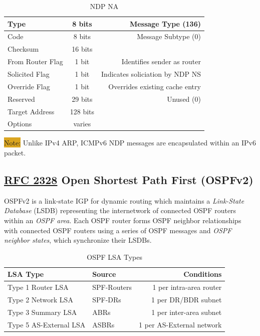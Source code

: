 \documentclass[12pt]{article}
\newcommand{\note}[1]{\colorbox{#1}{Note:}}
\newcommand{\RFC}[1]{\href{https://datatracker.ietf.org/doc/html/rfc#1}{RFC #1}}
\begin{document}
	\begin{table}[H]
	\centering
	\caption{NDP NA \label{tab:NDP NA}}
	\begin{tabular}{| l | c | r |}
	\hline
	Type				& 8 bits	& Message Type (136)\\\hline
	Code				& 8 bits	& Message Subtype (0)\\\hline
	Checksum			& 16 bits	&\\\hline
	From Router Flag		& 1 bit 	& Identifies sender as router\\\hline
	Solicited Flag		& 1 bit 	& Indicates soliciation by NDP NS\\\hline
	Override Flag		& 1 bit 	& Overrides existing cache entry\\\hline
	Reserved			& 29 bits	& Unused (0)\\\hline
	Target Address		& 128 bits	&\\\hline
	Options			& varies	&\\\hline
	\end{tabular}\end{table}
	\note{Goldenrod} Unlike IPv4 ARP, ICMPv6 NDP messages are encapsulated within an IPv6 packet.


	\subsection{\RFC{2328} Open Shortest Path First (OSPFv2) \label{subsec:OSPFv2}}
	OSPFv2 is a link-state IGP for dynamic routing which maintains a \textit{Link-State Database} (LSDB) representing the internetwork of connected OSPF routers within an \textit{OSPF area}. Each OSPF router forms OSPF neighbor relationships with connected OSPF routers using a series of OSPF messages and \textit{OSPF neighbor states}, which synchronize their LSDBs.

	\begin{table}[H]
	\centering
	\caption{OSPF LSA Types \label{tab:OSPF LSA TYPES}}
	\begin{tabular}{llr}
	\hline
	\textbf{LSA Type}		& \textbf{Source}		& \textbf{Conditions}\\\hline
	Type 1 Router LSA		& SPF-Routers		& 1 per intra-area router\\\hline
	Type 2 Network LSA	& SPF-DRs			& 1 per DR/BDR subnet\\\hline
	Type 3 Summary LSA	& ABRs			& 1 per inter-area subnet\\\hline
	Type 5 AS-External LSA	& ASBRs			& 1 per AS-External network\\\hline
	\end{tabular}\end{table}
	
\end{document}

